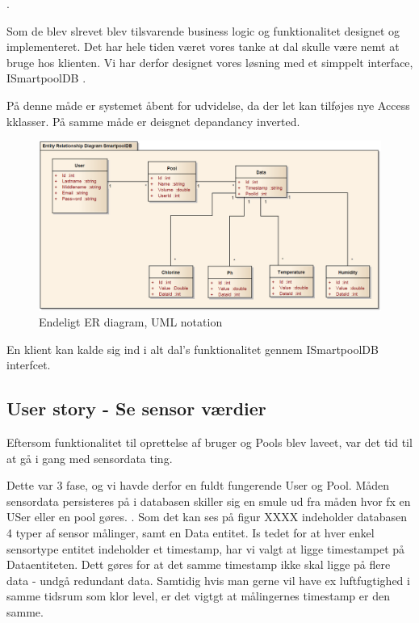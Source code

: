 .

Som de blev slrevet blev tilsvarende business logic og funktionalitet designet og implementeret.
Det har hele tiden været vores tanke at dal skulle være nemt at bruge hos klienten. Vi har derfor designet vores løsning med et simppelt interface, ISmartpoolDB .

På denne måde er systemet åbent for udvidelse, da der let kan tilføjes nye Access kklasser. På samme måde er deisgnet depandancy inverted.

\begin{figure}[h]
	\centering
	\includegraphics[width=\linewidth]{figs/design/databaseERD_final_uml}
	\caption{Endeligt ER diagram, UML notation}
	\label{fig:databaseERD_final_uml}
\end{figure}

En klient kan kalde sig ind i alt dal's funktionalitet gennem ISmartpoolDB interfcet.



\subsection{User story - Se sensor værdier}

Eftersom funktionalitet til oprettelse af bruger og Pools blev laveet, var  det tid til at gå i gang med sensordata ting.

Dette var 3 fase, og vi havde derfor en fuldt fungerende User og Pool. Måden sensordata persisteres på i databasen skiller sig en smule ud fra måden hvor fx en USer eller en pool gøres. . Som det kan ses på figur XXXX indeholder databasen 4 typer af sensor målinger, samt en Data entitet. Is tedet for at hver enkel sensortype entitet indeholder et timestamp, har vi valgt at ligge timestampet på Dataentiteten. Dett gøres for at det samme timestamp ikke skal ligge på flere data - undgå redundant data.  Samtidig hvis man gerne vil have ex luftfugtighed i samme tidsrum som klor level, er det vigtgt at målingernes timestamp er den samme.

